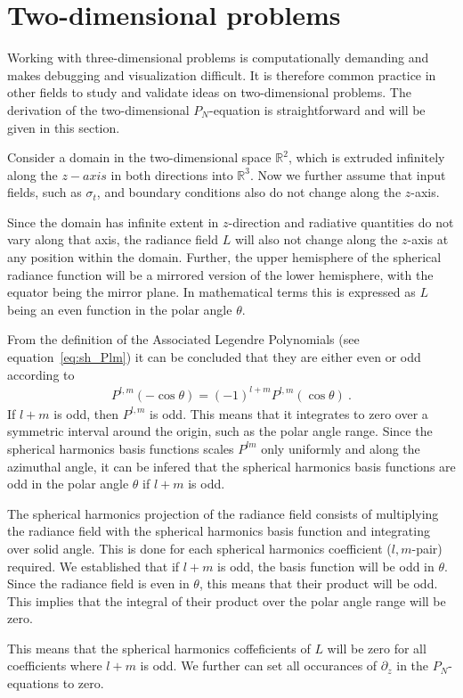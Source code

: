 \section{Two-dimensional problems}
\label{sec:pn_2d}

Working with three-dimensional problems is computationally demanding and makes debugging and visualization difficult. It is therefore common practice in other fields to study and validate ideas on two-dimensional problems. The derivation of the two-dimensional $P_N$-equation is straightforward and will be given in this section.

Consider a domain in the two-dimensional space $\mathbb{R}^2$, which is extruded infinitely along the $z-axis$ in both directions into $\mathbb{R}^3$. Now we further assume that input fields, such as $\sigma_t$, and boundary conditions also do not change along the $z$-axis.

Since the domain has infinite extent in $z$-direction and radiative quantities do not vary along that axis, the radiance field $L$ will also not change along the $z$-axis at any position within the domain. Further, the upper hemisphere of the spherical radiance function will be a mirrored version of the lower hemisphere, with the equator being the mirror plane. In mathematical terms this is expressed as $L$ being an even function in the polar angle $\theta$.

From the definition of the Associated Legendre Polynomials (see equation~\ref{eq:sh_Plm}) it can be concluded that they are either even or odd according to
\begin{align}
P^{l,m}\left(-\operatorname{cos}\theta\right) = 
\left(-1\right)^{l+m}
P^{l,m}\left(\operatorname{cos}\theta\right)
\ .
\end{align}
If $l+m$ is odd, then $P^{l,m}$ is odd. This means that it integrates to zero over a symmetric interval around the origin, such as the polar angle range. Since the spherical harmonics basis functions scales $P^{lm}$ only uniformly and along the azimuthal angle, it can be infered that the spherical harmonics basis functions are odd in the polar angle $\theta$ if $l+m$ is odd.

The spherical harmonics projection of the radiance field consists of multiplying the radiance field with the spherical harmonics basis function and integrating over solid angle. This is done for each spherical harmonics coefficient ($l,m$-pair) required. We established that if $l+m$ is odd, the basis function will be odd in $\theta$. Since the radiance field is even in $\theta$, this means that their product will be odd. This implies that the integral of their product over the polar angle range will be zero.

This means that the spherical harmonics coffeficients of $L$ will be zero for all coefficients where $l+m$ is odd. We further can set all occurances of $\partial_z$ in the $P_N$-equations to zero.

